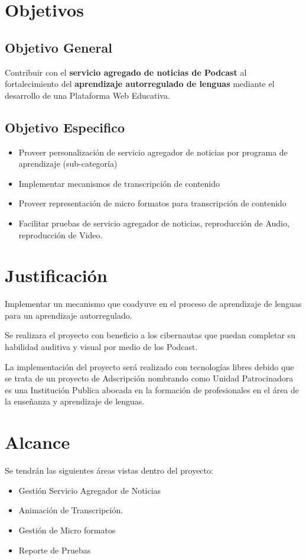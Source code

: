 \section{Objetivos}

\subsection{Objetivo General}

Contribuir con el \textbf{servicio agregado de noticias de Podcast} al fortalecimiento
del \textbf{aprendizaje autorregulado de lenguas} mediante el desarrollo de una
Plataforma Web Educativa.

\subsection{Objetivo Especifico}

\begin{itemize}

\item Proveer personalización de servicio agregador de noticias por programa de
aprendizaje (sub-categoría)

\item Implementar mecanismos de transcripción de contenido

\item Proveer representación de micro formatos para transcripción de contenido

\item Facilitar pruebas de servicio agregador de noticias, reproducción de Audio,
reproducción de Video.

\end{itemize}

\section{Justificación}
Implementar un mecanismo que coadyuve en el proceso de aprendizaje de lenguas
para un aprendizaje autorregulado.

Se realizara el proyecto con beneficio a los cibernautas que puedan completar su
habilidad auditiva y visual por medio de los Podcast.

La implementación del proyecto será realizado con tecnologías libres debido que se
trata de un proyecto de Adscripción nombrando como Unidad Patrocinadora es una
Institución Publica abocada en la formación de profesionales en el área de la
enseñanza y aprendizaje de lenguas.

\section{Alcance}

Se tendrán las siguientes áreas vistas dentro del proyecto:

\begin{itemize}

\item Gestión Servicio Agregador de Noticias
\item Animación de Transcripción.
\item Gestión de Micro formatos
\item Reporte de Pruebas

\end{itemize}
